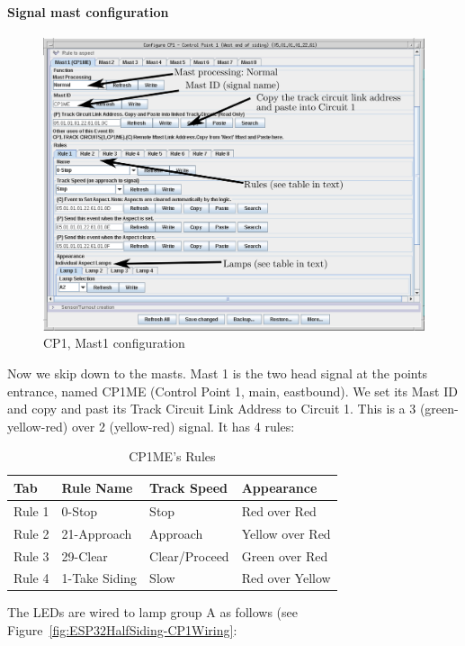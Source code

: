 \paragraph{Signal mast configuration}
\begin{figure}[hbpt]\begin{centering}%
\includegraphics[width=5in]{CP1-Mast1-Config-Annotated.png}
\caption{CP1, Mast1 configuration}
\label{fig:CP1-Mast1-Config}
\end{centering}\end{figure}
Now we skip down to the masts. Mast 1 is the two head signal at the points
entrance, named CP1ME (Control Point 1, main, eastbound). We set its Mast ID
and copy and past its Track Circuit Link Address to Circuit 1. This is a 3
(green-yellow-red) over 2 (yellow-red) signal. It has 4 rules:
\begin{table}[htp]\begin{centering}\begin{tabular}{|l|l|l|l|}
\hline
Tab&Rule Name&Track Speed&Appearance\\
\hline
Rule 1&0-Stop&Stop&Red over Red\\
Rule 2&21-Approach&Approach&Yellow over Red\\
Rule 3&29-Clear&Clear/Proceed&Green over Red\\
Rule 4&1-Take Siding&Slow&Red over Yellow\\
\hline
\end{tabular}
\caption{CP1ME's Rules}
\label{tab:CP1MERules}
\end{centering}\end{table}
The LEDs are wired to lamp group A as follows (see Figure~\ref{fig:ESP32HalfSiding-CP1Wiring}: 

